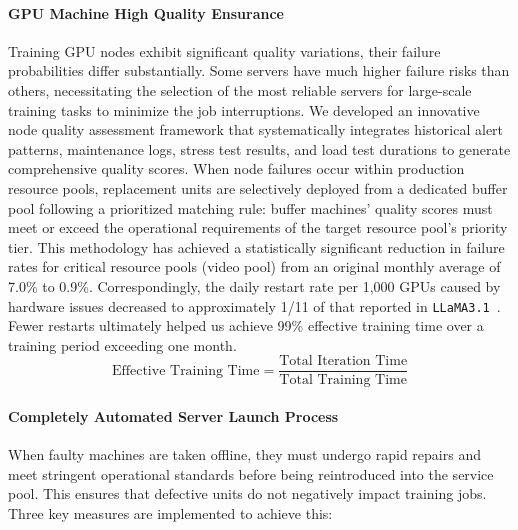 \paragraph{GPU Machine High Quality Ensurance}
Training GPU nodes exhibit significant quality variations, \ie their failure probabilities differ substantially. Some servers have much higher failure risks than others, necessitating the selection of the most reliable servers for large-scale training tasks to minimize the job interruptions.
We developed an innovative node quality assessment framework that systematically integrates historical alert patterns, maintenance logs, stress test results, and load test durations to generate comprehensive quality scores. When node failures occur within production resource pools, replacement units are selectively deployed from a dedicated buffer pool following a prioritized matching rule: buffer machines' quality scores must meet or exceed the operational requirements of the target resource pool's priority tier. This methodology has achieved a statistically significant reduction in failure rates for critical resource pools (\ie video pool) from an original monthly average of 7.0\% to 0.9\%. Correspondingly, the daily restart rate per 1,000 GPUs caused by hardware issues decreased to approximately 1/11 of that reported in \texttt{LLaMA3.1}~\citep{llama3}.
\\
Fewer restarts ultimately helped us achieve 99\% effective training time over a training period exceeding one month.
\[\text{Effective Training Time} = \frac{\text{Total Iteration Time}}{\text{Total Training Time}}\]

\paragraph{Completely Automated Server Launch Process}
When faulty machines are taken offline, they must undergo rapid repairs and meet stringent operational standards before being reintroduced into the service pool. This ensures that defective units do not negatively impact training jobs. Three key measures are implemented to achieve this:

